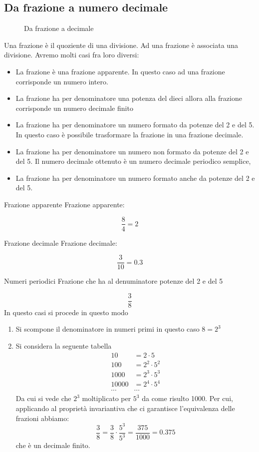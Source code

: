 \subsection{Da frazione a numero decimale}
\begin{figure}
	\centering
	
	\caption{Da frazione a decimale}
	\label{fig:DaFrazioniaDecimale}
\end{figure}
Una frazione è il quoziente di una divisione.  Ad una frazione è associata una divisione. Avremo molti casi fra loro diversi:
\begin{itemize}
	\item La frazione è una frazione apparente. In questo caso ad una frazione corrisponde un numero intero.
	\item La frazione ha per denominatore una potenza del dieci allora alla frazione corrisponde un numero decimale finito  
	\item La frazione ha per denominatore un numero formato da potenze del \num{2} e del \num{5}. In questo caso è possibile trasformare la frazione in una frazione decimale.
	\item La frazione ha per denominatore un numero non formato da potenze del \num{2} e del \num{5}. Il numero decimale ottenuto è un numero decimale periodico semplice, 
	\item La frazione ha per denominatore un numero formato anche da potenze del \num{2} e del \num{5}. 
\end{itemize}
\begin{esempiot}{Frazione apparente}{}
Frazione apparente: 
\end{esempiot}
\[\dfrac{8}{4}=\num{2}\]
\begin{esempiot}{Frazione decimale}{}
Frazione decimale:
\end{esempiot}
\[\dfrac{3}{10}=\num{0.3}\]
\begin{esempiot}{Numeri periodici}{}
	Frazione che ha al denuminatore potenze del \num{2} e del \num{5}
\end{esempiot}
\[\dfrac{3}{8}\] In questo casi si procede in questo modo\begin{enumerate}
			\item Si scompone il denominatore in numeri primi in questo caso $8=2^3$
			\item Si considera la seguente tabella 
			\begin{align*}
			\num{10}&=2\cdot 5\\
			\num{100}&=2^2\cdot 5^2\\
			\num{1000}&=2^3\cdot 5^3\\
			\num{10000}&=2^4\cdot 5^4\\
			\cdots&\cdots
			\end{align*}
			Da cui si vede che $2^3$ moltiplicato per $5^3$ da come risulto \num{1000}. Per cui, applicando al proprietà invariantiva che ci garantisce l'equivalenza delle frazioni abbiamo:\[\dfrac{3}{8}=\dfrac{3}{8}\cdot\dfrac{5^3}{5^3}=\dfrac{375}{1000}=\num{0,375}\] che è un decimale finito.
		\end{enumerate}
